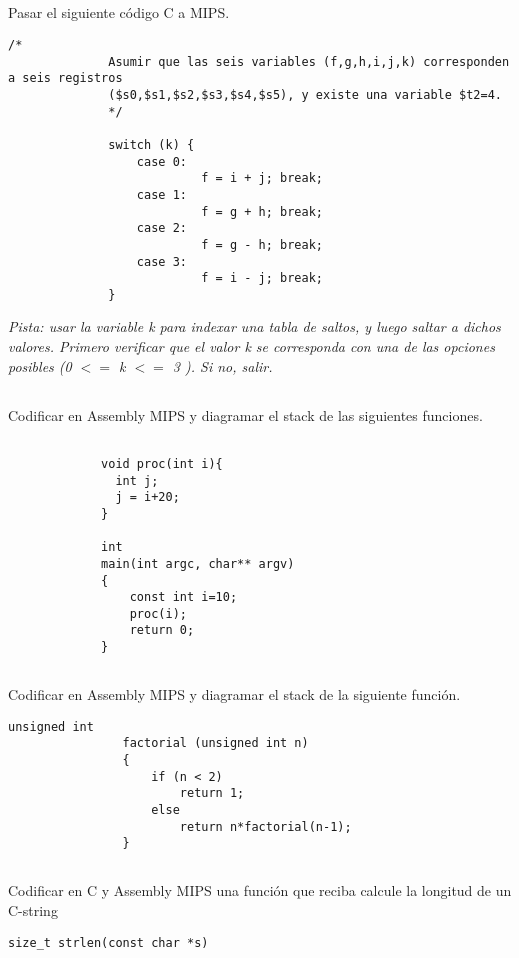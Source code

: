 \subsection{}
      Pasar el siguiente código C a MIPS.
      \begin{small}
          \begin{lstlisting}[style=6620C]
              /*
              Asumir que las seis variables (f,g,h,i,j,k) corresponden a seis registros 
              ($s0,$s1,$s2,$s3,$s4,$s5), y existe una variable $t2=4.
              */
               
              switch (k) {
                  case 0:
                           f = i + j; break; 
                  case 1:
                           f = g + h; break;
                  case 2:
                           f = g - h; break; 
                  case 3:
                           f = i - j; break; 
              }
          \end{lstlisting}
      \end{small}
      \textit{Pista: usar la variable k para indexar una tabla de saltos, y luego 
      saltar a dichos valores.
      Primero verificar que el valor k se corresponda con una de las opciones posibles
      (0 \(<=\) k \(<=\) 3 ). Si no, salir.}
     \vfill    

\subsection{}
     Codificar en Assembly MIPS y diagramar el stack de las siguientes funciones.
           \begin{small}
             \begin{lstlisting}[style=6620C]
             
             void proc(int i){
               int j;
               j = i+20; 
             } 

             int 
             main(int argc, char** argv)
             {
                 const int i=10; 
                 proc(i); 
                 return 0; 
             } 
           \end{lstlisting}
     \end{small}

\subsection{}
  Codificar en Assembly MIPS y diagramar el stack de la siguiente función.
        \begin{small}
            \begin{lstlisting}[style=6620C]
                unsigned int
                factorial (unsigned int n)
                {
                    if (n < 2)
                        return 1;
                    else 
                        return n*factorial(n-1);
                }
            \end{lstlisting}
        \end{small}

\subsection{}
  Codificar en C  y Assembly MIPS una función que reciba calcule la longitud de un C-string\\
  \begin{lstlisting}[style=6620C]
  size_t strlen(const char *s)
  \end{lstlisting}
